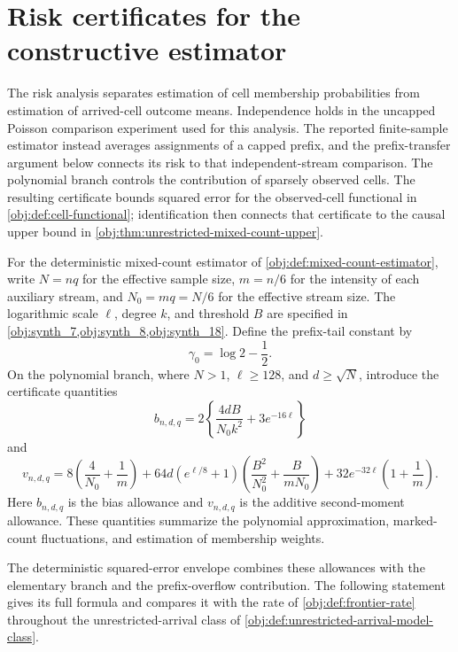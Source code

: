 \documentclass[11pt]{article}
\begin{document}
\section{Risk certificates for the constructive estimator}

The risk analysis separates estimation of cell membership probabilities from estimation of arrived-cell outcome means. Independence holds in the uncapped Poisson comparison experiment used for this analysis. The reported finite-sample estimator instead averages assignments of a capped prefix, and the prefix-transfer argument below connects its risk to that independent-stream comparison. The polynomial branch controls the contribution of sparsely observed cells. The resulting certificate bounds squared error for the observed-cell functional in \cref{obj:def:cell-functional}; identification then connects that certificate to the causal upper bound in \cref{obj:thm:unrestricted-mixed-count-upper}.

For the deterministic mixed-count estimator  of \cref{obj:def:mixed-count-estimator}, write \(N=nq\) for the effective sample size, \(m=n/6\) for the intensity of each auxiliary stream, and \(N_0=mq=N/6\) for the effective stream size. The logarithmic scale \(\ell\), degree \(k\), and threshold \(B\) are specified in \cref{obj:synth_7,obj:synth_8,obj:synth_18}. Define the prefix-tail constant by
\[
\gamma_0=\log 2-\frac12.
\]
On the polynomial branch, where \(N>1\), \(\ell\ge128\), and \(d\ge\sqrt N\), introduce the certificate quantities
\[
b_{n,d,q}
=2\left\{\frac{4dB}{N_0k^2}+3e^{-16\ell}\right\}
\]
and
\[
v_{n,d,q}
=8\left(\frac4{N_0}+\frac1m\right)
+64d(e^{\ell/8}+1)
\left(\frac{B^2}{N_0^2}+\frac{B}{mN_0}\right)
+32e^{-32\ell}\left(1+\frac1m\right).
\]
Here \(b_{n,d,q}\) is the bias allowance and \(v_{n,d,q}\) is the additive second-moment allowance. These quantities summarize the polynomial approximation, marked-count fluctuations, and estimation of membership weights.

The deterministic squared-error envelope  combines these allowances with the elementary branch and the prefix-overflow contribution. The following statement gives its full formula and compares it with the rate  of \cref{obj:def:frontier-rate} throughout the unrestricted-arrival class  of \cref{obj:def:unrestricted-arrival-model-class}.
\end{document}
